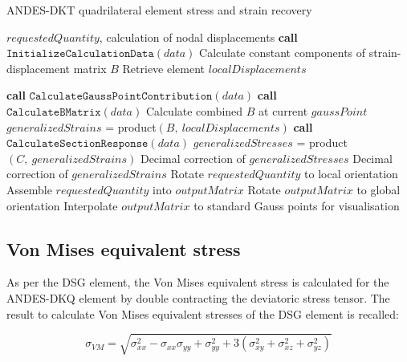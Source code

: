 \begin{algorithm}[tbh]
	\onehalfspacing
	\caption{ANDES-DKT quadrilateral element stress and strain recovery}
	\label{ANDES-DKT quadrilateral element stress and strain recovery}
	\begin{algorithmic}[1]
		\Require $requestedQuantity$, calculation of nodal displacements
		\State \textbf{call} $\texttt{InitializeCalculationData}(data)$
		\State \hspace{\algorithmicindent}Calculate constant components of strain-displacement matrix $B$
		\State \hspace{\algorithmicindent}Retrieve element $localDisplacements$
		
		\State \textbf{call} $\texttt{CalculateGaussPointContribution}(data)$
		\State \hspace{\algorithmicindent}\textbf{call} $\texttt{CalculateBMatrix}(data)$
		\State \hspace{\algorithmicindent}\hspace{\algorithmicindent} Calculate combined $B$ at current $gaussPoint$
		\State $generalizedStrains$ = product$(B,\ localDisplacements)$
		\State \textbf{call} $\texttt{CalculateSectionResponse}(data)$
		\State $generalizedStresses$ = product $(C,\ generalizedStrains)$
		\State Decimal correction of $generalizedStresses$
		\EndIf
		\State Decimal correction of $generalizedStrains$ 
		\State Rotate $requestedQuantity$ to local orientation
		\EndIf
		\State Assemble $requestedQuantity$ into $outputMatrix$
		\State Rotate $outputMatrix$ to global orientation
		\EndIf
		\State Interpolate $outputMatrix$ to standard Gauss points for visualisation
		\EndWhile
	\end{algorithmic}
\end{algorithm}

\subsection{Von Mises equivalent stress}

As per the DSG element, the Von Mises equivalent stress is calculated for the ANDES-DKQ element by double contracting the deviatoric stress tensor. The result to calculate Von Mises equivalent stresses of the DSG element is recalled:

\begin{equation} 
\sigma_{VM} = 
\sqrt{
	\sigma_{xx}^2
	- \sigma_{xx}\sigma_{yy}
	+ \sigma_{yy}^2
	+ 3(\sigma_{xy}^2 + \sigma_{xz}^2 + \sigma_{yz}^2)
}
\label{eqqrec5}
\end{equation}

